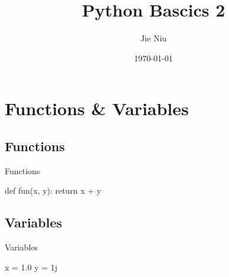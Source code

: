 \documentclass{beamer}
\title{Python Bascics 2}
\author{Jie Niu}
\institute{IGWES, JNU}
\date{\today}
\begin{document}
\begin{frame}
  \titlepage
\end{frame}

\section{Functions \& Variables}
\subsection{Functions}

\begin{frame}[fragile]{Functions}
  \begin{pythoncode}
    def fun(x, y):
      return x + y
  \end{pythoncode}
\end{frame}

\begin{frame}
\end{frame}

\subsection{Variables}

\begin{frame}[fragile]{Variables}
  \begin{pythoncode}
    x = 1.0
    y = 1j
  \end{pythoncode}
\end{frame}

\begin{frame}
\end{frame}
\end{document}
